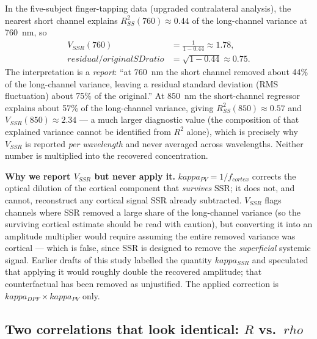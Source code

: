 \documentclass[12pt]{article}
\def\kappa{kappa}%
\def\rho{rho}%
\def\mathrm#1{#1}%
\def\text#1{#1}%
\begin{document}
\begin{workexample}
In the five-subject finger-tapping data (upgraded contralateral analysis), the nearest short channel explains $R^2_{\mathrm{SS}}(760) \approx 0.44$ of the long-channel variance at 760~nm, so
\begin{align}
V_{\mathrm{SSR}}(760) &= \frac{1}{1-0.44} \approx 1.78, \\
\text{residual/original SD ratio} &= \sqrt{1-0.44} \approx 0.75 .
\end{align}
The interpretation is a \emph{report}: ``at 760~nm the short channel removed about 44\% of the long-channel variance, leaving a residual standard deviation (RMS fluctuation) about 75\% of the original.'' At 850~nm the short-channel regressor explains about 57\% of the long-channel variance, giving $R^2_{\mathrm{SS}}(850)\approx0.57$ and $V_{\mathrm{SSR}}(850)\approx2.34$ --- a much larger diagnostic value (the composition of that explained variance cannot be identified from $R^2$ alone), which is precisely why $V_{\mathrm{SSR}}$ is reported \emph{per wavelength} and never averaged across wavelengths. Neither number is multiplied into the recovered concentration.
\end{workexample}

\begin{keyinsight}
\textbf{Why we report $V_{\mathrm{SSR}}$ but never apply it.} $\kappa_{\text{PV}}=1/f_{\text{cortex}}$ corrects the optical dilution of the cortical component that \emph{survives} SSR; it does not, and cannot, reconstruct any cortical signal SSR already subtracted. $V_{\mathrm{SSR}}$ flags channels where SSR removed a large share of the long-channel variance (so the surviving cortical estimate should be read with caution), but converting it into an amplitude multiplier would require assuming the entire removed variance was cortical --- which is false, since SSR is designed to remove the \emph{superficial} systemic signal. Earlier drafts of this study labelled the quantity $\kappa_{\mathrm{SSR}}$ and speculated that applying it would roughly double the recovered amplitude; that counterfactual has been removed as unjustified. The applied correction is $\kappa_{\text{DPF}}\times\kappa_{\text{PV}}$ only.
\end{keyinsight}

\subsection{Two correlations that look identical: \texorpdfstring{$R$ vs.\ $\rho$}{R vs. rho}}
\end{document}
